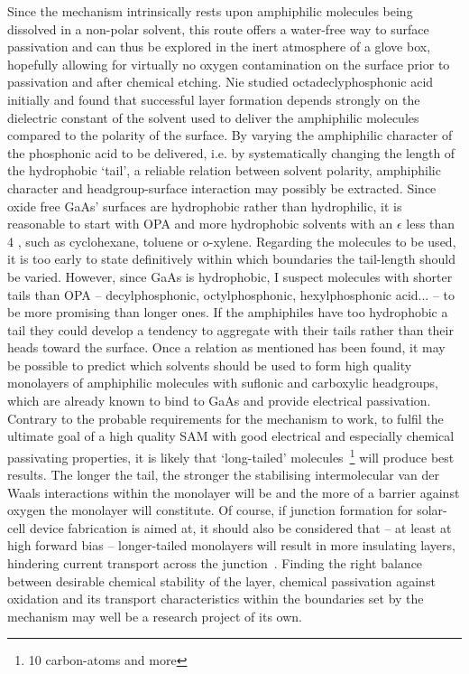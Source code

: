 \documentclass[a4paper]{article}
\begin{document}
Since  the mechanism intrinsically rests upon amphiphilic molecules being dissolved in a non-polar solvent, this route offers a water-free way to surface passivation and can thus be explored in the inert atmosphere of a glove box, hopefully allowing for virtually no oxygen contamination on the surface prior to passivation and after chemical etching. Nie studied octadeclyphosphonic acid initially and found that successful layer formation depends strongly on the dielectric constant of the solvent used to deliver the amphiphilic molecules compared to the polarity of the surface. By varying the amphiphilic character of the phosphonic acid to be delivered, i.e. by systematically changing the length of the hydrophobic `tail', a reliable relation between solvent polarity, amphiphilic character and headgroup-surface interaction may possibly be extracted. Since oxide free GaAs' surfaces are hydrophobic rather than hydrophilic, it is reasonable to start with OPA and more hydrophobic solvents with an $\epsilon$ less than 4 , such as cyclohexane, toluene or o-xylene. Regarding the molecules to be used, it is too early to state definitively within which boundaries the tail-length should be varied. However, since GaAs is hydrophobic, I suspect molecules with shorter tails than OPA -- decylphosphonic, octylphosphonic, hexylphosphonic acid... -- to be more promising than longer ones. If the amphiphiles have too hydrophobic a tail they could develop a tendency to aggregate with their tails rather than their heads toward the surface. Once a relation as mentioned has been found, it may be possible to predict which solvents should be used to form high quality monolayers of amphiphilic molecules with suflonic and carboxylic headgroups, which are already known to bind to GaAs and provide electrical passivation. Contrary to the probable requirements for the mechanism to work, to fulfil the ultimate goal of a high quality SAM with good electrical and especially chemical passivating properties, it is likely that `long-tailed' molecules~\footnote{10 carbon-atoms and more} will produce best results. The longer the tail, the stronger the stabilising intermolecular van der Waals interactions within the monolayer will be and the more of a barrier against oxygen the monolayer will constitute. Of course, if junction formation for solar-cell device fabrication is aimed at, it should also be considered that -- at least at high forward bias -- longer-tailed monolayers will result in more insulating layers, hindering current transport across the junction~\cite{alkyltransport}. Finding the right balance between desirable chemical stability of the layer, chemical passivation against oxidation and its transport characteristics within the boundaries set by the mechanism may well be a research project of its own.\\
\end{document}
